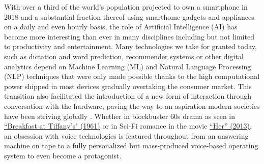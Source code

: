 


With over a third of the world's population projected to own a smartphone in 2018 \cite{statistasmartphones} and a substantial fraction thereof using smarthome gadgets and appliances on a daily and even hourly basis, the role of Artificial Intelligence (AI) has become more interesting than ever in many disciplines including but not limited to productivity and entertainment.
Many technologies we take for granted today, such as dictation and word prediction, recommender systems or other digital analytics depend on Machine Learning (ML) and Natural Language Processing (NLP) techniques that were only made possible thanks to the high computational power shipped in most devices gradually overtaking the consumer market.
This transition also facilitated the introduction of a new form of interaction through conversation with the hardware, paving the way to an aspiration modern societies have been striving globally \cite{Starwars}.
Whether in blockbuster 60s drama as seen in \href{http://www.imdb.com/title/tt0054698/?ref_=nv_sr_1}{``Breakfast at Tiffany's" (1961)} or in Sci-Fi romance in the movie \hypertarget{hermovie}{\href{http://www.imdb.com/title/tt1798709/}{``Her'' (2013)}}, an obsession with voice technologies is featured throughout from an answering machine on tape to a fully personalized but mass-produced voice-based operating system to even become a protagonist.

